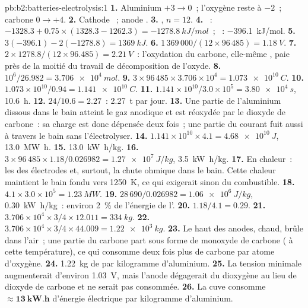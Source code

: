 \begin{solution}{pb:b2:batteries-electrolysis:1}
\textbf{1.} Aluminium $+3 \to 0$~; l'oxygène reste à $-2$~; carbone $0 \to +4$.
\textbf{2.} Cathode ~; anode .
\textbf{3.} , $n = 12$.
\textbf{4.} ~: $-1328.3 + 0.75 \times (1328.3 - 1262.3) = \qty{-1278.8}{kJ/mol}$~;
~: \qty{-396.1}{kJ/mol}.
\textbf{5.} $3(-396.1) - 2(-1278.8) = \qty{+1369}{kJ}$.
\textbf{6.} $1\,369\,000/(12 \times 96\,485) = \qty{1.18}{V}$.
\textbf{7.} $2 \times 1278.8/(12 \times 96.485) = \qty{2.21}{V}$~: l'oxydation du carbone,
elle-même , paie près de la moitié du travail de décomposition de l'oxyde.
\textbf{8.} $10^6/26.982 = \qty{3.706e4}{mol}$.
\textbf{9.} $3 \times 96\,485 \times 3.706 \times 10^4 = \qty{1.073e10}{C}$.
\textbf{10.} $1.073 \times 10^{10}/0.94 = \qty{1.141e10}{C}$.
\textbf{11.} $1.141 \times 10^{10}/3.0 \times 10^5 = \qty{3.80e4}{s}$, \qty{10.6}{h}.
\textbf{12.} $24/10.6 = 2.27$~: \qty{2.27}{t} par jour.
\textbf{13.} Une partie de l'aluminium dissous dans le bain atteint le gaz anodique et
est réoxydée par le dioxyde de carbone~: sa charge est donc dépensée deux fois~; une partie du courant
fuit aussi à travers le bain sans l'électrolyser.
\textbf{14.} $1.141 \times 10^{10} \times 4.1 = \qty{4.68e10}{J}$, \qty{13.0}{MW.h}.
\textbf{15.} \qty{13.0}{kW.h/kg}.
\textbf{16.} $3 \times 96\,485 \times 1.18/0.026982 = \qty{1.27e7}{J/kg}$, \qty{3.5}{kW.h/kg}.
\textbf{17.} En chaleur~: les  des électrodes et, surtout, la
chute ohmique dans le bain. Cette chaleur maintient le bain fondu vers
\qty{1250}{K}, ce qui exigerait sinon du combustible.
\textbf{18.} $4.1 \times 3.0 \times 10^5 = \qty{1.23}{MW}$.
\textbf{19.} $28\,690/0.026982 = \qty{1.06e6}{J/kg}$, \qty{0.30}{kW.h/kg}~: environ 2~\% de
l'énergie de l'.
\textbf{20.} $1.18/4.1 = 0.29$.
\textbf{21.} $3.706 \times 10^4 \times 3/4 \times 12.011 = \qty{334}{kg}$.
\textbf{22.} $3.706 \times 10^4 \times 3/4 \times 44.009 = \qty{1.22e3}{kg}$.
\textbf{23.} Le haut des anodes, chaud, brûle dans l'air~; une partie du carbone part
sous forme de monoxyde de carbone ( à cette température), ce qui consomme deux fois
plus de carbone par atome d'oxygène.
\textbf{24.} \qty{1.22}{kg} de  par kilogramme d'aluminium.
\textbf{25.} La tension minimale augmenterait d'environ \qty{1.03}{V}, mais l'anode
dégagerait du dioxygène au lieu de dioxyde de carbone et ne serait pas consommée.
\textbf{26.} La cuve consomme $\boldsymbol{\approx \qty{13}{kW.h}}$ d'énergie électrique
par kilogramme d'aluminium.
\end{solution}
